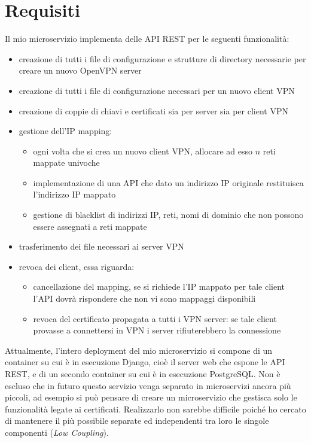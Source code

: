 \section{Requisiti}
Il mio microservizio implementa delle API REST per le seguenti funzionalità:
\begin{itemize}
  \item creazione di tutti i file di configurazione e strutture di directory
  necessarie per creare un nuovo OpenVPN server
  \item creazione di tutti i file di configurazione necessari per un nuovo client VPN
  \item creazione di coppie di chiavi e certificati sia per server sia per client VPN
  \item gestione dell'IP mapping:
  \begin{itemize}
    \item ogni volta che si crea un nuovo client VPN, allocare ad esso $n$ reti mappate
    univoche
    \item implementazione di una API che dato un indirizzo IP originale restituisca
    l'indirizzo IP mappato
    \item gestione di blacklist di indirizzi IP, reti, nomi di dominio che non
    possono essere assegnati a reti mappate
  \end{itemize}
  \item trasferimento dei file necessari ai server VPN
  \item revoca dei client, essa riguarda:
  \begin{itemize}
    \item cancellazione del mapping, se si richiede l'IP mappato per tale client
    l'API dovrà rispondere che non vi sono mappaggi disponibili
    \item revoca del certificato propagata a tutti i VPN server: se tale client
    provasse a connettersi in VPN i server rifiuterebbero la connessione
  \end{itemize}
\end{itemize}

Attualmente, l'intero deployment del mio microservizio si compone di un container
su cui è in esecuzione Django, cioè il server web che espone le API REST, e
di un secondo container su cui è in esecuzione PostgreSQL.
Non è escluso che in futuro questo servizio venga separato in microservizi
ancora più piccoli, ad esempio si può pensare di creare un microservizio
che gestisca solo le funzionalità legate ai certificati. Realizzarlo non sarebbe
difficile poiché ho cercato di mantenere il più possibile separate ed independenti
tra loro le singole componenti (\textit{Low Coupling}).

